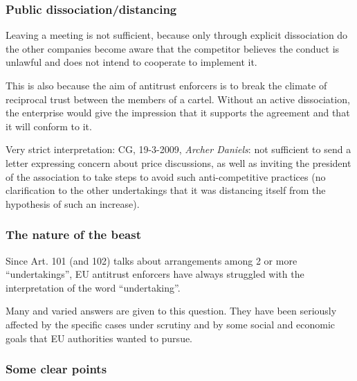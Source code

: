         \subsubsection{Public dissociation/distancing}

            Leaving a meeting is not sufficient, because only through explicit dissociation do the other companies become aware that the competitor believes the conduct is unlawful and does not intend to cooperate to implement it.
        
            This is also because the aim of antitrust enforcers is to break the climate of reciprocal trust between the members of a cartel. Without an active dissociation, the enterprise would give the impression that it supports the agreement and that it will conform to it.
        
            Very strict interpretation: CG, 19-3-2009, \textit{Archer Daniels}: not sufficient to send a letter expressing concern about price discussions, as well as inviting the president of the association to take steps to avoid such anti-competitive practices (no clarification to the other undertakings that it was distancing itself from the hypothesis of such an increase).

        \subsubsection{The nature of the beast}

            Since Art. 101 (and 102) talks about arrangements among 2 or more “undertakings”, EU antitrust enforcers have always struggled with the interpretation of the word “undertaking”.


            Many and varied answers are given to this question. They have been seriously affected by the specific cases under scrutiny and by some social and economic goals that EU authorities wanted to pursue.

        \subsubsection{Some clear points}

